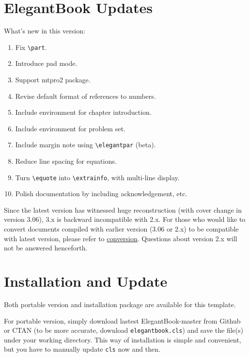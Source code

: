\documentclass[fancy,blue,11pt]{elegantbook}
\begin{document}
\section{ElegantBook Updates}
What\rq s new in this version:
\begin{enumerate}
   \item Fix \lstinline|\part|.
   \item Introduce pad mode.
   \item Support mtpro2 package.
   \item Revise default format of references to numbers.
   \item Include environment for chapter introduction.
   \item Include environment for problem set.
   \item Include margin note using \lstinline{\elegantpar} (beta).
   \item Reduce line spacing for equations.
   \item Turn \lstinline{\equote} into \lstinline{\extrainfo}, with multi-line display.
   \item Polish documentation by including acknowledgement, etc.
\end{enumerate}

\begin{note}
	Since the latest version has witnessed huge reconstruction (with cover change in version 3.06), 3.x is backward incompatible with 2.x. For those who would like to convert documents compiled with earlier version (3.06 or 2.x) to be compatible with latest version, please refer to \href{https://github.com/ElegantLaTeX/ElegantBook/wiki/convert}{conversion}. Questions about version 2.x will not be answered henceforth.
\end{note}

\section{Installation and Update}
Both portable version and installation package are available for this template.

For portable version, simply download lastest ElegantBook-master from Github or CTAN (to be more accurate, download \lstinline{elegantbook.cls}) and save the file(s) under your working directory. This way of installation is simple and convenient, but you have to manually update \lstinline{cls} now and then.
\end{document}

